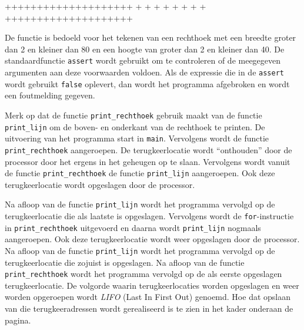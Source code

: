 \begin{dosbox}[title=Uitvoer van het programma in listing~\ref{cod:print_rechthoek}.,label=fig:print_rechthoek]
++++++++++++++++++++
+                  +
+                  +
+                  +
+                  +
++++++++++++++++++++
\end{dosbox}


De functie is bedoeld voor het tekenen van een rechthoek met een breedte groter dan 2 en kleiner dan 80 en een hoogte van groter dan 2 en kleiner dan 40. 
De standaardfunctie \texttt{assert} wordt gebruikt om te controleren of de meegegeven argumenten aan deze voorwaarden voldoen.
Als de expressie die in de \texttt{assert} wordt gebruikt \texttt{false} oplevert, dan wordt het programma afgebroken en wordt een foutmelding gegeven.

Merk op dat de functie \texttt{print\_rechthoek} gebruik maakt van de functie \texttt{print\_lijn} om de boven- en onderkant van de rechthoek te printen.
De uitvoering van het programma start in \texttt{main}.
Vervolgens wordt de functie \texttt{print\_rechthoek} aangeroepen.
De terugkeerlocatie wordt ``onthouden'' door de processor door het ergens in het geheugen op te slaan.
Vervolgens wordt vanuit de functie \texttt{print\_rechthoek} de functie \texttt{print\_lijn} aangeroepen. 
Ook deze terugkeerlocatie wordt opgeslagen door de processor.

Na afloop van de functie \texttt{print\_lijn} wordt het programma vervolgd op de terugkeerlocatie die als laatste is opgeslagen.
Vervolgens wordt de \texttt{for}-instructie in \texttt{print\_rechthoek} uitgevoerd en daarna wordt \texttt{print\_lijn} nogmaals aangeroepen.
Ook deze terugkeerlocatie wordt weer opgeslagen door de processor.
Na afloop van de functie \texttt{print\_lijn} wordt het programma vervolgd op de terugkeerlocatie die zojuist is opgeslagen.
Na afloop van de functie \texttt{print\_rechthoek} wordt het programma vervolgd op de als eerste opgeslagen terugkeerlocatie.
De volgorde waarin terugkeerlocaties worden opgeslagen en weer worden opgeroepen wordt \textsl{LIFO} (Last In First Out) genoemd.
Hoe dat opslaan van die terugkeeradressen wordt gerealiseerd is te zien in het kader onderaan de pagina.

